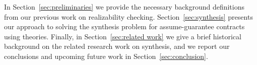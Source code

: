 In Section~\ref{sec:preliminaries} we provide the necessary background
definitions from our previous work on realizability checking.
Section~\ref{sec:synthesis} presents our approach to solving the synthesis
problem for assume-guarantee contracts using theories. Finally, in
Section~\ref{sec:related work} we give a brief historical background on the
related research work on synthesis, and we report our conclusions and upcoming
future work in Section~\ref{sec:conclusion}.